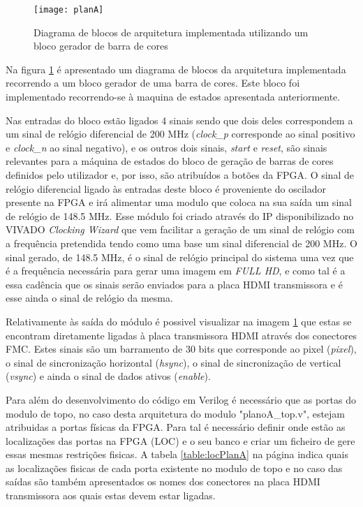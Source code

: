 \begin{figure}[h!]
	\begin{center}
		\leavevmode
		\texttt{[image: planA]}
		\caption{Diagrama de blocos de arquitetura implementada utilizando um bloco gerador de barra de cores}
		\label{fig:planA}
	\end{center}
\end{figure}

Na figura \ref{fig:planA} é apresentado um diagrama de blocos da arquitetura implementada recorrendo a um bloco gerador de uma barra de cores. Este bloco foi implementado recorrendo-se à maquina de estados apresentada anteriormente.

Nas entradas do bloco estão ligados 4 sinais sendo que dois deles correspondem a um sinal de relógio diferencial de 200 MHz (\textit{clock\_p} corresponde ao sinal positivo e \textit{clock\_n} ao sinal negativo), e os outros dois sinais, \textit{start} e \textit{reset}, são sinais relevantes para a máquina de estados do bloco de geração de barras de cores definidos pelo utilizador e, por isso, são atribuídos a botões da FPGA. O sinal de relógio diferencial ligado às entradas deste bloco é proveniente do oscilador presente na FPGA e irá alimentar uma modulo que coloca na sua saída um sinal de relógio de 148.5 MHz. Esse módulo foi criado através do IP disponibilizado no VIVADO \textit{Clocking Wizard} que vem facilitar a geração de um sinal de relógio com a frequência pretendida tendo como uma base um sinal diferencial de 200 MHz. O sinal gerado, de 148.5 MHz, é o sinal de relógio principal do sistema uma vez que é a frequência necessária para gerar uma imagem em \textit{FULL HD}, e como tal é a essa cadência que os sinais serão enviados para a placa HDMI transmissora e é esse ainda o sinal de relógio da mesma.

Relativamente às saída do módulo é possivel visualizar na imagem \ref{fig:planA} que estas se encontram diretamente ligadas à placa transmissora HDMI através dos conectores FMC. Estes sinais são um barramento de 30 bits que corresponde ao pixel (\textit{pixel}), o sinal de sincronização horizontal (\textit{hsync}), o sinal de sincronização de vertical (\textit{vsync}) e ainda o sinal de dados ativos (\textit{enable}).

Para além do desenvolvimento do código em Verilog é necessário que as portas do modulo de topo, no caso desta arquitetura do modulo "planoA\_top.v", estejam atribuidas a portas físicas da FPGA. Para tal é necessário definir onde estão as localizações das portas na FPGA (LOC) e o seu banco e criar um ficheiro de gere essas mesmas restrições fisicas. A tabela \ref{table:locPlanA} na página \pageref{table:locPlanA} indica quais as localizações fisicas de cada porta existente no modulo de topo e no caso das saídas são também apresentados os nomes dos conectores na placa HDMI transmissora aos quais estas devem estar ligadas.

